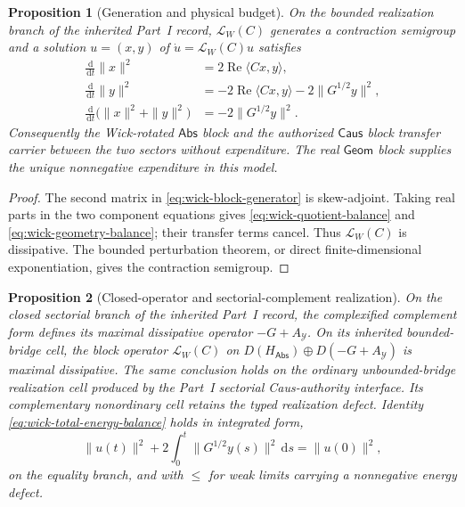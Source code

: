 \documentclass[11pt]{article}
\numberwithin{section}{part}
\theoremstyle{plain}
\newtheorem{proposition}[proposition]{Proposition}
\theoremstyle{definition}
\theoremstyle{remark}
\newcommand{\dd}{\,\mathrm d}
\newcommand{\Geom}{\mathsf{Geom}}
\newcommand{\Caus}{\mathsf{Caus}}
\newcommand{\Abs}{\mathsf{Abs}}
\begin{document}
\begin{proposition}[Generation and physical budget]
\label{prop:wick-generation-budget}
On the bounded realization branch of the inherited Part~I record,
\(\mathcal L_W(C)\) generates a contraction semigroup and a
solution \(u=(x,y)\) of \(\dot u=\mathcal L_W(C)u\) satisfies
\begin{align}
 \frac{\dd}{\dd t}\|x\|^2
 &=2\operatorname{Re}\langle Cx,y\rangle,
 \label{eq:wick-quotient-balance}\\
 \frac{\dd}{\dd t}\|y\|^2
 &=-2\operatorname{Re}\langle Cx,y\rangle
   -2\|G^{1/2}y\|^2,
 \label{eq:wick-geometry-balance}\\
 \frac{\dd}{\dd t}\bigl(\|x\|^2+\|y\|^2\bigr)
 &=-2\|G^{1/2}y\|^2.
 \label{eq:wick-total-energy-balance}
\end{align}
Consequently the Wick-rotated \(\Abs\) block and the authorized \(\Caus\)
block transfer carrier between the two sectors without expenditure.  The
real \(\Geom\) block supplies the unique nonnegative expenditure in this
model.
\end{proposition}

\begin{proof}
The second matrix in \eqref{eq:wick-block-generator} is skew-adjoint.
Taking real parts in the two component equations gives
\eqref{eq:wick-quotient-balance} and
\eqref{eq:wick-geometry-balance}; their transfer terms cancel.  Thus
\(\mathcal L_W(C)\) is dissipative.  The bounded perturbation theorem, or
direct finite-dimensional exponentiation, gives the contraction semigroup.
\end{proof}

\begin{proposition}[Closed-operator and sectorial-complement realization]
\label{prop:wick-sectorial-realization}
On the closed sectorial branch of the inherited Part~I record, the
complexified complement form defines its maximal dissipative operator
\(-G+A_{\mathcal Y}\).  On its inherited bounded-bridge cell, the block operator
\(\mathcal L_W(C)\) on
\(D(H_{\Abs})\oplus D(-G+A_{\mathcal Y})\) is maximal dissipative.  The same
conclusion holds on the ordinary unbounded-bridge realization cell produced
by the Part~I sectorial Caus-authority interface.  Its complementary
nonordinary cell retains the typed realization defect.  Identity
\eqref{eq:wick-total-energy-balance} holds in integrated form,
\begin{equation}
 \label{eq:wick-integrated-energy-balance}
 \|u(t)\|^2+2\int_0^t\|G^{1/2}y(s)\|^2\dd s=\|u(0)\|^2,
\end{equation}
on the equality branch, and with \(\le\) for weak limits carrying a
nonnegative energy defect.
\end{proposition}
\end{document}
